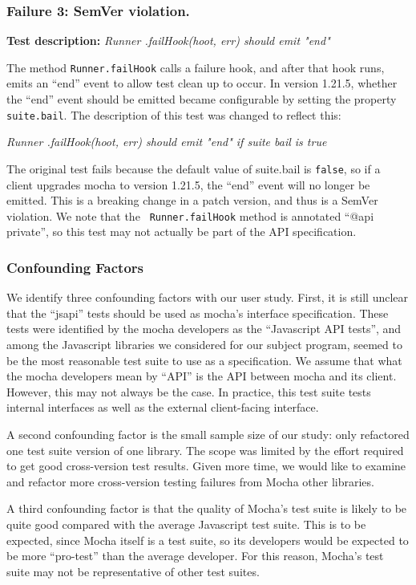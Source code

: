 \subsubsection{Failure 3: SemVer violation.}

{\bf Test description:}
%
{\em Runner .failHook(hoot, err) should emit "end" }

The method {\tt Runner.failHook} calls a failure hook, and after that
hook runs, emits an ``end'' event to allow test clean up to occur. In
version 1.21.5, whether the ``end'' event should be emitted became
configurable by setting the property {\tt suite.bail}.  The
description of this test was changed to reflect this:

{\em Runner .failHook(hoot, err) should emit "end" if suite bail is
  true }

The original test fails because the default value of suite.bail is
{\tt false}, so if a client upgrades mocha to version 1.21.5, the
``end'' event will no longer be emitted. This is a breaking change in
a patch version, and thus is a SemVer violation. We note that the {\tt
  Runner.failHook} method is annotated ``@api private'', so this test
may not actually be part of the API specification.

\subsubsection{Confounding Factors}
We identify three confounding factors with our user study. First, it
is still unclear that the ``jsapi'' tests should be used as mocha's
interface specification. These tests were identified by the mocha
developers as the ``Javascript API tests'', and among the Javascript
libraries we considered for our subject program, seemed to be the most
reasonable test suite to use as a specification. We assume that what
the mocha developers mean by ``API'' is the API between mocha and its
client. However, this may not always be the case. In practice, this
test suite tests internal interfaces as well as the external
client-facing interface.

A second confounding factor is the small sample size of our study:
only refactored one test suite version of one library. The scope was
limited by the effort required to get good cross-version test
results. Given more time, we would like to examine and refactor more
cross-version testing failures from Mocha other libraries.

A third confounding factor is that the quality of Mocha's test suite
is likely to be quite good compared with the average Javascript test
suite. This is to be expected, since Mocha itself is a test suite, so
its developers would be expected to be more ``pro-test'' than the
average developer. For this reason, Mocha's test suite may not be
representative of other test suites.

